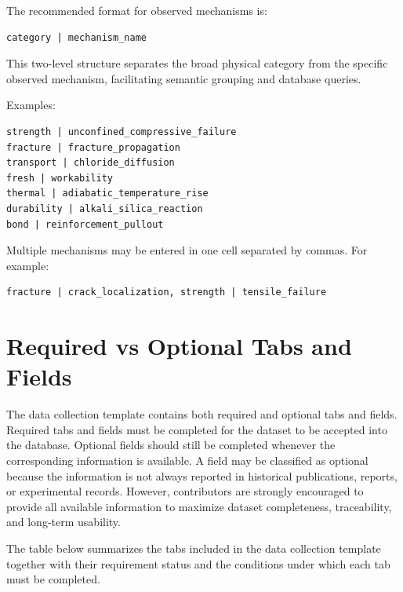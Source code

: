 \documentclass[11pt]{book}
\begin{document}
The recommended format for observed mechanisms is:

\begin{verbatim}
category | mechanism_name
\end{verbatim}

This two-level structure separates the broad physical category from the specific observed mechanism, facilitating semantic grouping and database queries.

\vspace{5 mm}
Examples:

\begin{verbatim}
strength | unconfined_compressive_failure
fracture | fracture_propagation
transport | chloride_diffusion
fresh | workability
thermal | adiabatic_temperature_rise
durability | alkali_silica_reaction
bond | reinforcement_pullout
\end{verbatim}

Multiple mechanisms may be entered in one cell separated by commas. For example:

\begin{verbatim}
fracture | crack_localization, strength | tensile_failure
\end{verbatim}

\section{Required vs Optional Tabs and Fields}

The data collection template contains both required and optional tabs and fields. Required tabs and fields must be completed for the dataset to be accepted into the database. Optional fields should still be completed whenever the corresponding information is available. A field may be classified as optional because the information is not always reported in historical publications, reports, or experimental records. However, contributors are strongly encouraged to provide all available information to maximize dataset completeness, traceability, and long-term usability.

The table below summarizes the tabs included in the data collection template together with their requirement status and the conditions under which each tab must be completed.
\end{document}
